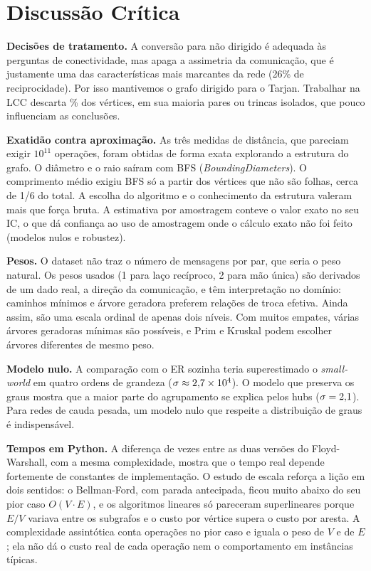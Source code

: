 \documentclass[sigconf]{webmedia}
\begin{document}
\section{Discussão Crítica}
\label{sec:discussao}

\textbf{Decisões de tratamento.} A conversão para não dirigido é adequada às perguntas
de conectividade, mas apaga a assimetria da comunicação, que é justamente uma das
características mais marcantes da rede (26\% de reciprocidade). Por isso mantivemos o
grafo dirigido para o Tarjan. Trabalhar na LCC descarta \pctDescartado\% dos vértices, em sua
maioria pares ou trincas isolados, que pouco influenciam as conclusões.

\textbf{Exatidão contra aproximação.} As três medidas de distância, que pareciam exigir
$10^{11}$ operações, foram obtidas de forma exata explorando a estrutura do grafo. O
diâmetro e o raio saíram com \nBfsDiam{} BFS (\emph{BoundingDiameters}). O comprimento
médio exigiu BFS só a partir dos vértices que não são folhas, cerca de 1/6 do total. A
escolha do algoritmo e o conhecimento da estrutura valeram mais que força bruta. A
estimativa por amostragem conteve o valor exato no seu IC, o que dá confiança ao uso de
amostragem onde o cálculo exato não foi feito (modelos nulos e robustez).

\textbf{Pesos.} O dataset não traz o número de mensagens por par, que seria o peso
natural. Os pesos usados (1 para laço recíproco, 2 para mão única) são derivados de um
dado real, a direção da comunicação, e têm interpretação no domínio: caminhos mínimos e
árvore geradora preferem relações de troca efetiva. Ainda assim, são uma escala ordinal
de apenas dois níveis. Com muitos empates, várias árvores geradoras mínimas são
possíveis, e Prim e Kruskal podem escolher árvores diferentes de mesmo peso.

\textbf{Modelo nulo.} A comparação com o ER sozinha teria superestimado o
\emph{small-world} em quatro ordens de grandeza ($\sigma\approx2{,}7\times10^{4}$). O modelo que
preserva os graus mostra que a maior parte do agrupamento se explica pelos hubs
($\sigma=2{,}1$). Para redes de cauda pesada, um modelo nulo que respeite a
distribuição de graus é indispensável.

\textbf{Tempos em Python.} A diferença de \razaoFw{} vezes entre as duas versões do
Floyd-Warshall, com a mesma complexidade, mostra que o tempo real depende fortemente
de constantes de implementação. O estudo de escala reforça a lição em dois sentidos: o
Bellman-Ford, com parada antecipada, ficou muito abaixo do seu pior caso $O(V\cdot E)$,
e os algoritmos lineares só pareceram superlineares porque $E/V$ variava entre os
subgrafos e o custo por vértice supera o custo por aresta. A complexidade assintótica
conta operações no pior caso e iguala o peso de $V$ e de $E$; ela não dá o custo real de
cada operação nem o comportamento em instâncias típicas.
\end{document}

